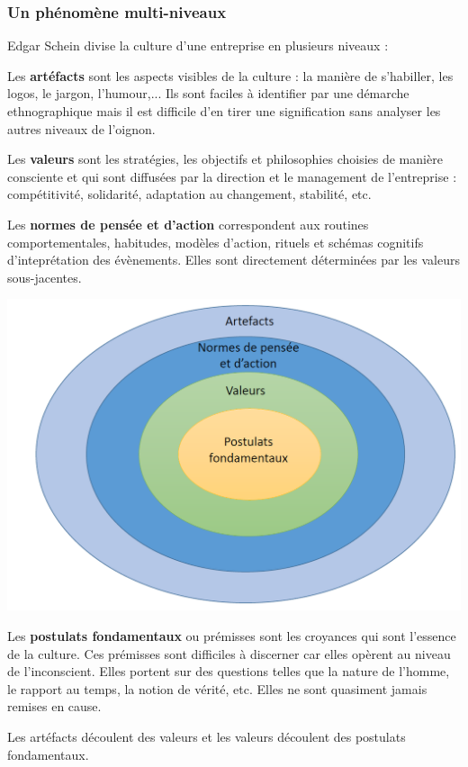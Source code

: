\documentclass[12pt]{article}
\begin{document}
	  \subsubsection{Un phénomène multi-niveaux}
	  
	  Edgar Schein divise la culture d'une entreprise en plusieurs niveaux :
	  
	  \begin{multicols}{2}
	  
	  Les \textbf{artéfacts} sont les aspects visibles de la culture : la manière de s'habiller, les logos, le jargon, l'humour,... Ils sont faciles à identifier par une démarche ethnographique mais il est difficile d'en tirer une signification sans analyser les autres niveaux de l'oignon.
	  
	  Les \textbf{valeurs} sont les stratégies, les objectifs et philosophies choisies de manière consciente et qui sont diffusées par la direction et le management de l'entreprise : compétitivité, solidarité, adaptation au changement, stabilité, etc.
	  
	  Les \textbf{normes de pensée et d'action} correspondent aux routines comportementales, habitudes, modèles d'action, rituels et schémas cognitifs d'inteprétation des évènements. Elles sont directement déterminées par les valeurs sous-jacentes.
	  	  
	  \begin{center}
	    \includegraphics[width=\linewidth]{culture_orga_niveaux.png}
	  \end{center}
	  Les \textbf{postulats fondamentaux} ou prémisses sont les croyances qui sont l'essence de la culture. Ces prémisses sont difficiles à discerner car elles opèrent au niveau de l'inconscient. Elles portent sur des questions telles que la nature de l'homme, le rapport au temps, la notion de vérité, etc. Elles ne sont quasiment jamais remises en cause.
	  
	  Les artéfacts découlent des valeurs et les valeurs découlent des postulats fondamentaux.
	  
	  \end{multicols}
	  
\end{document}
